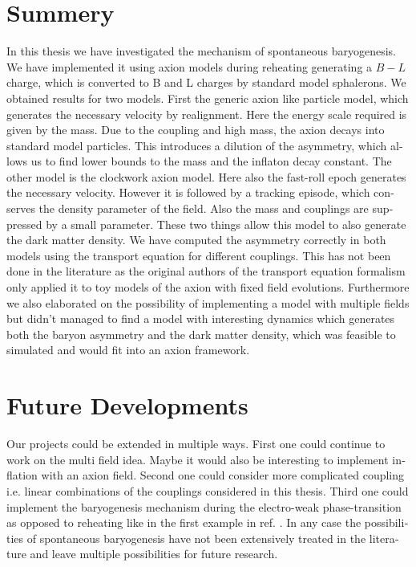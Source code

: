 \documentclass[master,       %
               twoside,        %
               BCOR10mm,       %
               english,ngerman, %
               ]{GAUBM}
\begin{document}
\begin{otherlanguage}{english}
\section{Summery}
In this thesis we have investigated the mechanism of spontaneous baryogenesis.
We have implemented it using axion models during reheating generating a $B - L$ charge, which is converted to B and L charges by standard model sphalerons.
We obtained results for two models. First the generic axion like particle model, which generates the necessary velocity by realignment.
Here the energy scale required is given by the mass. Due to the coupling and high mass, the axion decays into standard model particles.
This introduces a dilution of the asymmetry, which allows us to find lower bounds to the mass and the inflaton decay constant.
The other model is the clockwork axion model.
Here also the fast-roll epoch generates the necessary velocity. However it is followed by a tracking episode, which conserves the density parameter of the field.
Also the mass and couplings are suppressed by a small parameter.
These two things allow this model to also generate the dark matter density.
We have computed the asymmetry correctly in both models using the transport equation for different couplings. This has not been done in the literature as the original authors of the transport equation formalism only applied it to toy models of the axion with fixed field evolutions.
Furthermore we also elaborated on the possibility of implementing a model with multiple fields
but didn't managed to find a model with interesting dynamics which generates both the baryon asymmetry and the dark matter density, which was feasible to simulated and would fit into an axion framework.

\section{Future Developments}
Our projects could be extended in multiple ways.
First one could continue to work on the multi field idea. Maybe it would also be interesting to implement inflation with an axion field.
Second one could consider more complicated coupling i.e. linear combinations of the couplings considered in this thesis.
Third one could implement the baryogenesis mechanism during the electro-weak phase-transition as opposed to reheating like in the first example in ref. \cite{Domcke:2020kcp_Generic_Couplings}.
In any case the possibilities of spontaneous baryogenesis have not been extensively treated in the literature and leave multiple possibilities for future research.





\end{otherlanguage}
\end{document}
